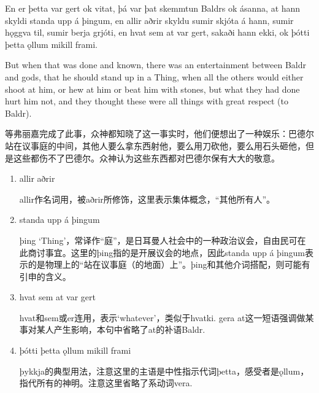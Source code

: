 \begin{paracol}{2}
    En er þetta var gert ok vitat, þá var þat skemmtun Baldrs ok ásanna, at hann skyldi standa upp á þingum, en allir aðrir skyldu sumir skjóta á hann, sumir hǫggva til, sumir berja grjóti, en hvat sem at var gert, sakaði hann ekki, ok þótti þetta ǫllum mikill frami.

    \switchcolumn

    But when that was done and known, there was an entertainment between Baldr and gods, that he should stand up in a Thing, when all the others would either shoot at him, or hew at him or beat him with stones, but what they had done hurt him not, and they thought these were all things with great respect (to Baldr).
\end{paracol}
\begin{translation*}{}
    等弗丽嘉完成了此事，众神都知晓了这一事实时，他们便想出了一种娱乐：巴德尔站在议事庭的中间，其他人要么拿东西射他，要么用刀砍他，要么用石头砸他，但是这些都伤不了巴德尔。众神认为这些东西都对巴德尔保有大大的敬意。
\end{translation*}
\begin{grammar*}{}
    \begin{enumerate}[leftmargin=*]
        \item allir aðrir

              allir作名词用，被aðrir所修饰，这里表示集体概念，“其他所有人”。
        \item standa upp á þingum

              þing `Thing'，常译作“庭”，是日耳曼人社会中的一种政治议会，自由民可在此商讨事宜。这里的þing指的是开展议会的地点，因此standa upp á þingum表示的是物理上的“站在议事庭（的地面）上”。þing和其他介词搭配，则可能有引申的含义。

        \item hvat sem at var gert

              hvat和sem或er连用，表示`whatever'，类似于hvatki. gera at这一短语强调做某事对某人产生影响，本句中省略了at的补语Baldr.

        \item þótti þetta ǫllum mikill frami

              þykkja的典型用法，注意这里的主语是中性指示代词þetta，感受者是ǫllum，指代所有的神明。注意这里省略了系动词vera.
    \end{enumerate}
\end{grammar*}

